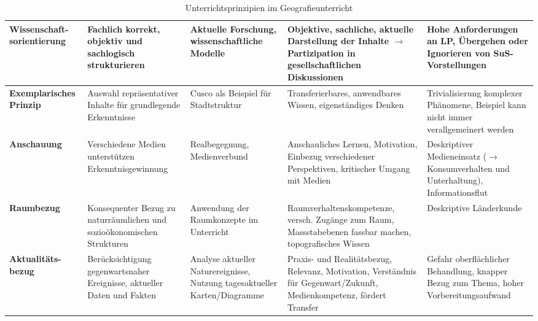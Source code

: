 \begin{landscape}
\begin{table}[h!]
\begin{tabular}{@{}>{\bfseries}p{2.5cm}|p{5cm}|p{4.4cm}|p{5.3cm}|p{5.2cm}@{}}
      Wissenschaft-\newline sorientierung & Fachlich korrekt, objektiv und sachlogisch strukturieren                             & Aktuelle Forschung, wissenschaftliche Modelle                              & Objektive, sachliche, aktuelle Darstellung der Inhalte $\rightarrow$ Partizipation in gesellschaftlichen Diskussionen  & Hohe Anforderungen an LP, Übergehen oder Ignorieren von SuS-Vorstellungen                                           \\\midrule
      Exemplarisches \newline Prinzip     & Auswahl repräsentativer Inhalte für grundlegende Erkenntnisse                        & Cusco als Beispiel für Stadtstruktur                                       & Transferierbares, anwendbares Wissen, eigenständiges Denken                                                            & Trivialisierung komplexer Phänomene, Beispiel kann nicht immer verallgemeinert werden                               \\\midrule
      Anschauung                          & Verschiedene Medien unterstützen Erkenntnisgewinnung                                 & Realbegegnung, Medienverbund                                               & Anschauliches Lernen, Motivation, Einbezug verschiedener Perspektiven, kritischer Umgang mit Medien                    & Deskriptiver Medieneinsatz ($\rightarrow$ Konsumverhalten und Unterhaltung), Informationsflut                       \\\midrule
      Raumbezug                           & Konsequenter Bezug zu naturräumlichen und sozioökonomischen Strukturen               & Anwendung der Raumkonzepte im Unterricht                                   & Raumverhaltenskompetenze, versch. Zugänge zum Raum, Massstabebenen fassbar machen, topografisches Wissen               & Deskriptive Länderkunde                                                                                             \\\midrule
      Aktualitäts-\newline bezug          & Berücksichtigung gegenwartsnaher Ereignisse, aktueller Daten und Fakten              & Analyse aktueller Naturereignisse, Nutzung tagesaktueller Karten/Diagramme & Praxis- und Realitätsbezug, Relevanz, Motivation, Verständnis für Gegenwart/Zukunft, Medienkompetenz, fördert Transfer & Gefahr oberflächlicher Behandlung, knapper Bezug zum Thema, hoher Vorbereitungsaufwand                              \\
    \end{tabular}
    \caption{Unterrichtsprinzipien im Geografieunterricht}
  \end{table}
\end{landscape}

